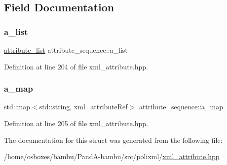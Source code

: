 \subsection{Field Documentation}
\mbox{\label{structattribute__sequence_a74e1f5a9e0b448658a73d565ae51662c}} 
\subsubsection{\texorpdfstring{a\+\_\+list}{a\_list}}
{\footnotesize\ttfamily \hyperlink{structattribute__sequence_ac9a1c1462a6334a140de3925dbeaae96}{attribute\+\_\+list} attribute\+\_\+sequence\+::a\+\_\+list\hspace{0.3cm}{\ttfamily [private]}}



Definition at line 204 of file xml\+\_\+attribute.\+hpp.

\mbox{\label{structattribute__sequence_a7d3f391a24ae70b3340b64301188ad08}} 
\subsubsection{\texorpdfstring{a\+\_\+map}{a\_map}}
{\footnotesize\ttfamily std\+::map$<$std\+::string, xml\+\_\+attribute\+Ref$>$ attribute\+\_\+sequence\+::a\+\_\+map\hspace{0.3cm}{\ttfamily [private]}}



Definition at line 205 of file xml\+\_\+attribute.\+hpp.



The documentation for this struct was generated from the following file\+:\begin{DoxyCompactItemize}
\item 
/home/osboxes/bambu/\+Pand\+A-\/bambu/src/polixml/\hyperlink{xml__attribute_8hpp}{xml\+\_\+attribute.\+hpp}\end{DoxyCompactItemize}
